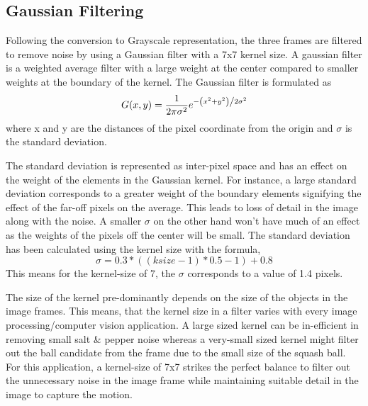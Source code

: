 \documentclass[a4paper]{article}
\begin{document}
\subsection{Gaussian Filtering}
Following the conversion to Grayscale representation, the three frames are filtered to remove noise by using a Gaussian filter with a 7x7 kernel size.
A gaussian filter is a weighted average filter with a large weight at the center compared to smaller weights at the boundary of the kernel. The Gaussian filter is formulated as
\begin{equation} \label{eq:Gaussian}
    G(x,y) = \frac{1}{{2\pi \sigma^2}}e^{{{ - \left( {x^2 + y^2 } \right)} \mathord{\left/ {\vphantom {{ - \left( {x - \mu } \right)^2 } {2\sigma ^2 }}} \right. \kern-\nulldelimiterspace} {2\sigma ^2 }}}
\end{equation}
where x and y are the distances of the pixel coordinate from the origin and $\sigma$ is the standard deviation. \par
The standard deviation is represented as inter-pixel space and has an effect on the weight of the elements in the Gaussian kernel. For instance, a large standard deviation corresponds to a greater weight of the boundary elements signifying the  effect of the far-off pixels on the average. This leads to loss of detail in the image along with the noise. A smaller $\sigma$ on the other hand won't have much of an effect as the weights of the pixels off the center will be small. The standard deviation has been calculated using the kernel size with the formula, 
\begin{equation} \label{eq:sigma}
    \sigma = 0.3*((ksize-1)*0.5 - 1) + 0.8
\end{equation}
This means for the kernel-size of 7, the $\sigma$ corresponds to a value of 1.4 pixels.\par
 
The size of the kernel pre-dominantly depends on the size of the objects in the image frames. This means, that the kernel size in a filter varies with every image processing/computer vision application.
A large sized kernel can be in-efficient in removing small salt \& pepper noise whereas a very-small sized kernel might filter out the ball candidate from the frame due to the small size of the squash ball. For this application, a kernel-size of 7x7 strikes the perfect balance to filter out the unnecessary noise in the image frame while maintaining suitable detail in the image to capture the motion.\par
\end{document}
